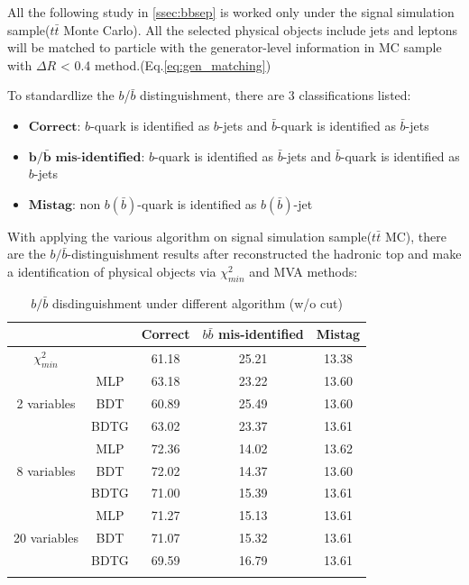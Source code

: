 		All the following study in \ref{ssec:bbsep} is worked only under the signal simulation sample($t$$\bar{t}$ Monte Carlo). All the selected physical objects include jets and leptons will be matched to particle with the generator-level information in MC sample with $\Delta R$ < 0.4 method.(Eq.\ref{eq:gen_matching})

		To standardlize the $b$/$\bar{b}$ distinguishment, there are 3 classifications listed:
		\begin{itemize}
  		\item $\textbf{Correct}$: $b$-quark is identified as $b$-jets and $\bar{b}$-quark is identified as $\bar{b}$-jets
  		\item $\textbf{b/}$$\bar{\textbf{b}}$ $\textbf{mis-identified}$: $b$-quark is identified as $\bar{b}$-jets and $\bar{b}$-quark is identified as $b$-jets
  		\item $\textbf{Mistag}$: non $b$$(\bar{b})$-quark is identified as $b$$(\bar{b})$-jet
		\end{itemize}

		With applying the various algorithm on signal simulation sample($t\bar{t}$ MC), there are the $b/\bar{b}$-distinguishment results after reconstructed the hadronic top and make a identification of physical objects via $\chi^2_{min}$ and MVA methods:

		\begin{center}
		\begin{longtable}[H]{ c c | c c c }			%
		\caption{$b/\bar{b}$ disdinguishment under different algorithm (w/o cut)}\\
		\hline
		[\%] & & Correct & $b\bar{b}$ mis-identified & Mistag  \\ 
		\hline
		$\chi^2_{min}$ &  & 61.18 & 25.21 & 13.38 \\
		\hline
		\multirow{3}{5em}{2 variables} & MLP & 63.18 & 23.22 & 13.60 \\
		& BDT & 60.89 & 25.49 & 13.60 \\
		& BDTG & 63.02 & 23.37 & 13.61 \\
		\hline
		\multirow{3}{5em}{8 variables} & MLP & 72.36 & 14.02 & 13.62 \\
		& BDT & 72.02 & 14.37 & 13.60 \\
		& BDTG & 71.00 & 15.39 & 13.61 \\
		\hline
		\multirow{3}{5em}{20 variables} & MLP & 71.27 & 15.13 & 13.61 \\
		& BDT & 71.07 & 15.32 & 13.61 \\
		& BDTG & 69.59 & 16.79 & 13.61 \\
		\hline
		\label{EventSelReco:tb:nocut_bbsep}
		\end{longtable}
		\end{center}

